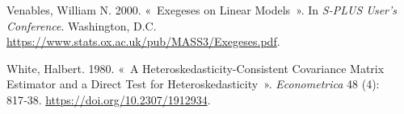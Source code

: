 \documentclass[
  11pt,
  letterpaper,
]{scrbook}
\newlength{\cslhangindent}
\newenvironment{CSLReferences}[2] %
 {\begin{list}{}{%
  \setlength{\itemindent}{0pt}
  \setlength{\leftmargin}{0pt}
  \setlength{\parsep}{0pt}
  \ifodd #1
   \setlength{\leftmargin}{\cslhangindent}
   \setlength{\itemindent}{-1\cslhangindent}
  \fi
  \setlength{\itemsep}{#2\baselineskip}}}
 {\end{list}}
\theoremstyle{definition}
\theoremstyle{definition}
\theoremstyle{plain}
\theoremstyle{plain}
\theoremstyle{remark}
\begin{document}
\begin{CSLReferences}{1}{0}
Venables, William N. 2000. {«~Exegeses on Linear Models~»}. In
\emph{S-PLUS User's Conference}. Washington, D.C.
\url{https://www.stats.ox.ac.uk/pub/MASS3/Exegeses.pdf}.

White, Halbert. 1980. {«~A Heteroskedasticity-Consistent Covariance
Matrix Estimator and a Direct Test for Heteroskedasticity~»}.
\emph{Econometrica} 48 (4): 817‑38.
\url{https://doi.org/10.2307/1912934}.

\end{CSLReferences}


\backmatter
\end{document}
